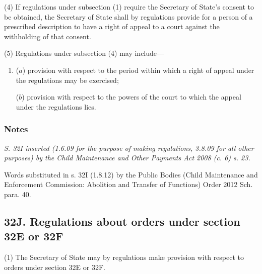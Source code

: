 \documentclass[a4paper]{article}
\newcommand\amendment[1]{\subsubsection*{Notes}{\itshape\frenchspacing\footnotesize #1 \par}}
\begin{document}
(4) If regulations under subsection (1) require the Secretary of State’s consent to
be obtained, the Secretary of State shall by regulations provide for a person of a
prescribed description to have a right of appeal to a court against the withholding of
that consent.

(5) Regulations under subsection (4) may include---
\begin{enumerate}\item[]
($a$) provision with respect to the period within which a right of appeal under the
regulations may be exercised;

($b$) provision with respect to the powers of the court to which the appeal under
the regulations lies.
\end{enumerate}

\amendment{
S. 32I inserted (1.6.09 for the purpose of making regulations, 3.8.09 for all other purposes) by the Child Maintenance and Other Payments Act 2008 (c. 6)
s. 23.

Words substituted in s. 32I (1.8.12) by the Public Bodies (Child Maintenance and Enforcement Commission: Abolition and Transfer of Functions) Order 2012 Sch. para. 40.
}

\subsection{32J. Regulations about orders under section 32E or 32F}

(1) The Secretary of State may by regulations make provision with respect to orders under section 32E or 32F.
\end{document}
